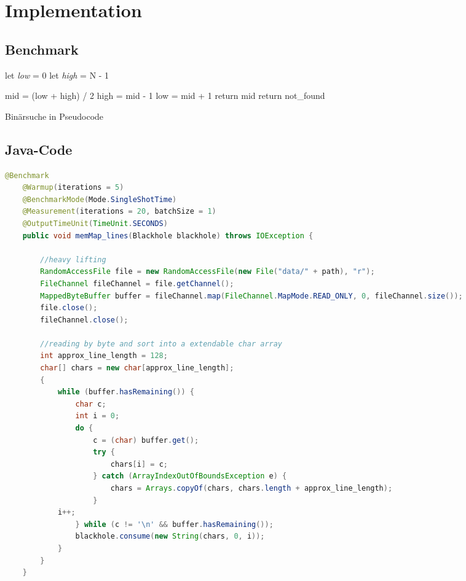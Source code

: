 \chapter{Implementation}
\label{Implementation}

\section{Benchmark}

\begin{algorithm}[H]
  let \textit{low} = 0
  let \textit{high} = N - 1
  
  
  {
    mid = (low + high) / 2\;
    {
      high = mid - 1\;
    }
    {
      {
	low = mid + 1\;
      }
      {
	return mid\;
      }
    }
    return not\_found\;
  }
  \label{binary_search}
  \caption{Binärsuche in Pseudocode}
\end{algorithm}


\section{Java-Code}

\begin{lstlisting}[language=java]
    @Benchmark
    @Warmup(iterations = 5)
    @BenchmarkMode(Mode.SingleShotTime)
    @Measurement(iterations = 20, batchSize = 1)
    @OutputTimeUnit(TimeUnit.SECONDS)
    public void memMap_lines(Blackhole blackhole) throws IOException {

        //heavy lifting
        RandomAccessFile file = new RandomAccessFile(new File("data/" + path), "r");
        FileChannel fileChannel = file.getChannel();
        MappedByteBuffer buffer = fileChannel.map(FileChannel.MapMode.READ_ONLY, 0, fileChannel.size());
        file.close();
        fileChannel.close();

        //reading by byte and sort into a extendable char array
        int approx_line_length = 128;
        char[] chars = new char[approx_line_length];
        {
            while (buffer.hasRemaining()) {
                char c;
                int i = 0;
                do {
                    c = (char) buffer.get();
                    try {
                        chars[i] = c;
                    } catch (ArrayIndexOutOfBoundsException e) {
                        chars = Arrays.copyOf(chars, chars.length + approx_line_length);
                    }
		    i++;
                } while (c != '\n' && buffer.hasRemaining());
                blackhole.consume(new String(chars, 0, i));
            }
        }
    }

\end{lstlisting}


